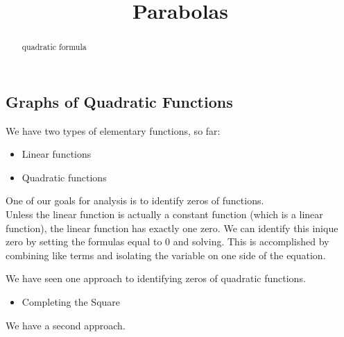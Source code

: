 \documentclass{ximera}
\title{Parabolas}
\begin{document}
\begin{abstract}
quadratic formula
\end{abstract}
\maketitle



\subsection{Graphs of Quadratic Functions}

We have two types of elementary functions, so far:

\begin{itemize}
\item Linear functions
\item Quadratic functions
\end{itemize}

One of our goals for analysis is to identify zeros of functions. \\

Unless the linear function is actually a constant function (which is a linear function), the linear function has exactly one zero. We can identify this inique zero by setting the formulas equal to $0$ and solving.  This is accomplished by combining like terms and isolating the variable on one side of the equation.

We have seen one approach to identifying zeros of quadratic functions.
\begin{itemize}
\item Completing the Square
\end{itemize}

We have a second approach. \\
\end{document}
